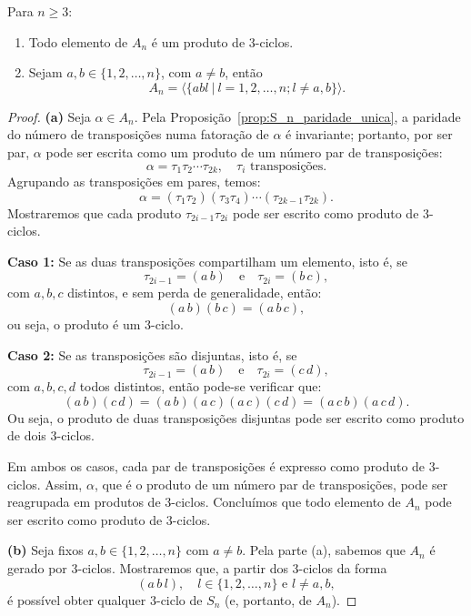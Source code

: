 \documentclass[11pt,openany]{book}
\newcommand{\gen}[1]{\ensuremath{\langle #1\rangle}}
\newenvironment{novo}{
    \color{red}
}{}
\begin{document}
\begin{novo}
\begin{proposition}
\label{prop:A_n_3_ciclos}
    Para $n \geq 3$:
    \begin{enumerate}[label=\alph*)]
        \item Todo elemento de $A_n$ é um produto de 3-ciclos.
        \item Sejam $a, b \in \{1,2,\dots,n\}$, com $a \not= b$, então
        \[A_n = \gen{\{abl \ | \ l = 1,2,\dots,n; l \not= a,b \}}.\]
    \end{enumerate}
\end{proposition}
\begin{proof}
    \textbf{(a)} Seja \(\alpha\in A_n\). Pela Proposição~\ref{prop:S_n_paridade_unica}, a paridade do número de transposições numa fatoração de \(\alpha\) é invariante; portanto, por ser par, \(\alpha\) pode ser escrita como um produto de um número par de transposições:
\[
\alpha = \tau_1\tau_2\cdots\tau_{2k}, \quad \tau_i\text{ transposições}.
\]
Agrupando as transposições em pares, temos:
\[
\alpha = (\tau_1\tau_2)(\tau_3\tau_4)\cdots(\tau_{2k-1}\tau_{2k}).
\]
Mostraremos que cada produto \(\tau_{2i-1}\tau_{2i}\) pode ser escrito como produto de \(3\)-ciclos.

\textbf{Caso 1:} Se as duas transposições compartilham um elemento, isto é, se
\[
\tau_{2i-1}=(a\,b)\quad \text{e}\quad \tau_{2i}=(b\,c),
\]
com \(a,b,c\) distintos, e sem perda de generalidade, então:
\[
(a\,b)(b\,c) = (a\,b\,c),
\]
ou seja, o produto é um \(3\)-ciclo.

\textbf{Caso 2:} Se as transposições são disjuntas, isto é, se
\[
\tau_{2i-1}=(a\,b)\quad \text{e}\quad \tau_{2i}=(c\,d),
\]
com \(a,b,c,d\) todos distintos, então pode-se verificar que:
\[
(a\,b)(c\,d) = (a\,b)(a\,c)(a\,c)(c\,d) = (a\,c\,b)(a\,c\,d).
\]
Ou seja, o produto de duas transposições disjuntas pode ser escrito como produto de dois \(3\)-ciclos.

Em ambos os casos, cada par de transposições é expresso como produto de \(3\)-ciclos. Assim, \(\alpha\), que é o produto de um número par de transposições, pode ser reagrupada em produtos de \(3\)-ciclos. Concluímos que todo elemento de \(A_n\) pode ser escrito como produto de \(3\)-ciclos.

\medskip

\textbf{(b)} Seja fixos \(a,b\in\{1,2,\dots,n\}\) com \(a\neq b\). Pela parte (a), sabemos que \(A_n\) é gerado por \(3\)-ciclos. Mostraremos que, a partir dos \(3\)-ciclos da forma
\[
(a\,b\,l),\quad l\in \{1,2,\dots,n\} \text{ e } l\neq a,b,
\]
é possível obter qualquer \(3\)-ciclo de \(S_n\) (e, portanto, de \(A_n\)).


\end{proof}
\end{novo}
\end{document}
